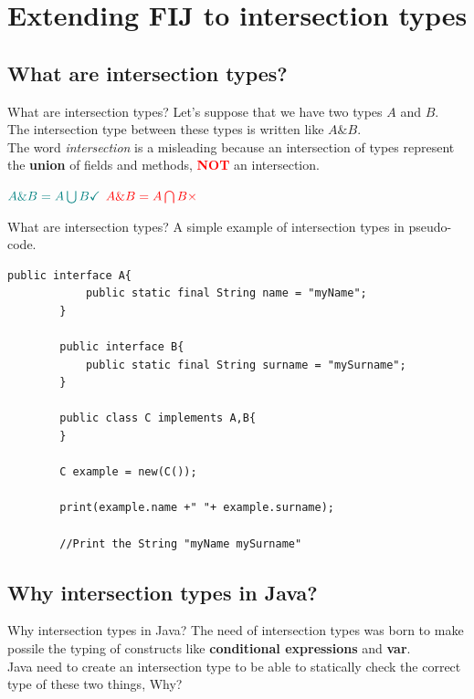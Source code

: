\documentclass{beamer}
\begin{document}
    \section{Extending FIJ to intersection types}

    \subsection{What are intersection types?}

    \begin{frame}{What are intersection types?}
    \boldmath
    Let's suppose that we have two types $A$ and $B$.\\
    The intersection type between these types is written like $A\&B$.\\
    The word \textit{intersection} is a misleading because an intersection of types represent the \textbf{union} of fields and methods, \textcolor{red}{\textbf{NOT}} an intersection.\\
    \begin{center}
    $\color{teal} A\&B = A \bigcup B \checkmark$ \hspace{1cm}
    $\color{red} A\&B = A \bigcap B \times$
    \end{center}
	\end{frame}

	\begin{frame}[fragile]{What are intersection types?}
	\boldmath
	A simple example of intersection types in pseudo-code.
	\begin{flushleft}
		\begin{lstlisting}[basicstyle=\scriptsize]
		public interface A{
			public static final String name = "myName";
		}

		public interface B{
			public static final String surname = "mySurname";
		}

		public class C implements A,B{
		}

	    C example = new(C());

	    print(example.name +" "+ example.surname);

	    //Print the String "myName mySurname"
		\end{lstlisting}
	\end{flushleft}
	\end{frame}

	\subsection{Why intersection types in Java?}
	\begin{frame}{Why intersection types in Java?}
	The need of intersection types was born to make possile the typing of constructs like \textbf{conditional expressions} and \textbf{var}.\\
	Java need to create an intersection type to be able to statically check the correct type of these two things, Why?
	\end{frame}
\end{document}
